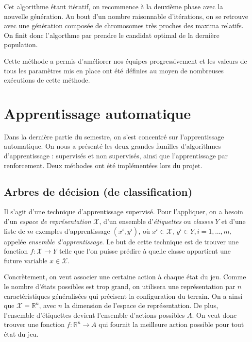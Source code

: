 \documentclass[12pt,a4paper]{article}
\begin{document}
Cet algorithme \'etant it\'eratif, on recommence \`a la deuxi\`eme phase avec 
la nouvelle g\'en\'eration. Au bout d'un nombre raisonnable d'it\'erations, on 
se retrouve avec une g\'en\'eration compos\'ee de chromosomes tr\`es proches des 
maxima relatifs. On finit donc l'algorthme par prendre le candidat optimal de la 
derni\`ere population.

Cette m\'ethode a permis d'am\'eliorer nos \'equipes progressivement et les 
valeurs de tous les param\`etres mis en place ont \'et\'e d\'efinies au moyen 
de nombreuses ex\'ecutions de cette m\'ethode.

\section{Apprentissage automatique}
Dans la derni\`ere partie du semestre, on s'est concentr\'e sur l'apprentissage 
automatique. On nous a pr\'esent\'e les deux grandes familles 
d'algorithmes d'apprentissage : supervis\'es et non supervis\'es, ainsi que 
l'apprentissage par renforcement. Deux m\'ethodes ont \'et\'e impl\'ement\'ees 
lors du projet.

\subsection*{Arbres de d\'ecision (de classification)}
Il s'agit d'une technique d'apprentissage supervis\'e. Pour l'appliquer, on 
a besoin d'un {\itshape espace de repr\'esentation} $\mathcal{X}$, d'un 
ensemble d'{\itshape \'etiquettes} ou {\itshape classes} $Y$ et d'une liste de 
$m$ exemples d'apprentissage $(x^i,y^i)$, o\`u $x^i \in \mathcal{X}$, $y^i \in 
Y, i = 1,\dotsc,m$, appel\'ee {\itshape ensemble d'apprentissage}.
Le but de cette technique est de trouver une fonction $f: \mathcal{X} \to 
Y$ telle que l'on puisse pr\'edire \`a quelle classe appartient une 
future variable $x \in \mathcal{X}$.

Concr\`etement, on veut associer une certaine action \`a chaque \'etat du jeu. 
Comme le nombre d'\'etats possibles est trop grand, on utilisera une 
repr\'esentation par $n$ caract\'eristiques g\'en\'eralis\'ees qui 
pr\'ecisent la configuration du terrain. On a ainsi que $\mathcal{X} = 
\mathbb{R}^n$, avec $n$ la dimension de l'espace de repr\'esentation. De plus, 
l'ensemble d'\'etiquettes devient l'ensemble d'actions possibles $A$. On veut 
donc trouver une fonction $f: \mathbb{R}^n \to A$ qui fournit la meilleure 
action possible pour tout \'etat du jeu.
\end{document}
